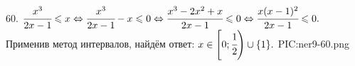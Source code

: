 60. $\cfrac{x^3}{2x-1}\leqslant x\Leftrightarrow\cfrac{x^3}{2x-1}-x\leqslant0\Leftrightarrow \cfrac{x^3-2x^2+x}{2x-1}\leqslant0\Leftrightarrow
\cfrac{x(x-1)^2}{2x-1}\leqslant0.$ Применив метод интервалов, найдём ответ: $x\in\left[0;\cfrac{1}{2}\right)\cup\{1\}.$
{{PIC:ner9-60.png}}\\
